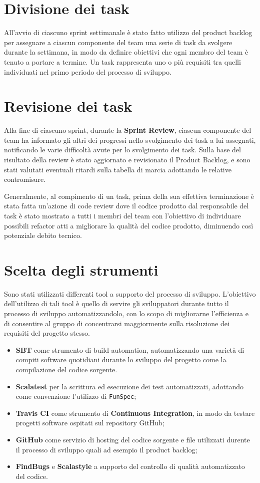 \section{Divisione dei task}
All'avvio di ciascuno sprint settimanale è stato fatto utilizzo del product backlog per assegnare a ciascun componente del team una serie di task da svolgere durante la settimana, in modo da definire obiettivi che ogni membro del team è tenuto a portare a termine. Un task rappresenta uno o più requisiti tra quelli individuati nel primo periodo del processo di sviluppo.

\section{Revisione dei task}
Alla fine di ciascuno sprint, durante la \textbf{Sprint Review}, ciascun componente del team ha informato gli altri dei progressi nello svolgimento dei task a lui assegnati, notificando le varie difficoltà avute per lo svolgimento dei task. Sulla base del risultato della review è stato aggiornato e revisionato il Product Backlog, e sono stati valutati eventuali ritardi sulla tabella di marcia adottando le relative contromisure.

Generalmente, al compimento di un task, prima della sua effettiva terminazione è stata fatta un'azione di code review dove il codice prodotto dal responsabile del task è stato mostrato a tutti i membri del team con l'obiettivo di individuare possibili refactor atti a migliorare la qualità del codice prodotto, diminuendo così potenziale debito tecnico.

\section{Scelta degli strumenti}
Sono stati utilizzati differenti tool a supporto del processo di sviluppo. L'obiettivo dell'utilizzo di tali tool è quello di servire gli sviluppatori durante tutto il processo di sviluppo automatizzandolo, con lo scopo di migliorarne l'efficienza e di consentire al gruppo di concentrarsi maggiormente sulla risoluzione dei requisiti del progetto stesso.

\begin{itemize}
    \item \textbf{SBT} come strumento di build automation, automatizzando una varietà di compiti software quotidiani durante lo sviluppo del progetto come la compilazione del codice sorgente.
    \item \textbf{Scalatest} per la scrittura ed esecuzione dei test automatizzati, adottando come convenzione l'utilizzo di \texttt{FunSpec};
    \item \textbf{Travis CI} come strumento di \textbf{Continuous Integration}, in modo da testare progetti software ospitati sul repository GitHub;
    \item \textbf{GitHub} come servizio di hosting del codice sorgente e file utilizzati durente il processo di sviluppo quali ad esempio il product backlog;
    \item \textbf{FindBugs} e \textbf{Scalastyle} a supporto del controllo di qualità automatizzato del codice.
\end{itemize}
